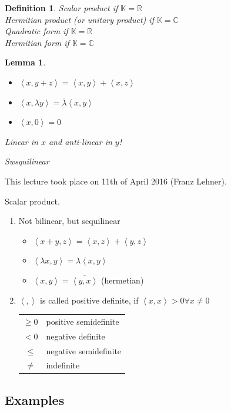 \documentclass[a4paper,landscape,twocolumn]{article}
\newcommand\meta[3]{This #1 took place on #2 (#3).\par}
\newcommand\functional[1]{\left\langle{#1}\right\rangle}
\newtheorem{defi}{Definition}
\newtheorem{lemma}{Lemma}
\begin{document}
\begin{defi}
  Scalar product if $\mathbb K = \mathbb R$ \\
  Hermitian product (or unitary product) if $\mathbb K = \mathbb C$ \\

  Quadratic form if $\mathbb K = \mathbb R$ \\
  Hermitian form if $\mathbb K = \mathbb C$
\end{defi}

\begin{lemma}
  \begin{itemize}
    \item $\functional{x,y+z} = \functional{x,y} + \functional{x,z}$
    \item $\functional{x,\lambda y} = \overline{\lambda} \functional{x,y}$
    \item $\functional{x,0} = 0$
  \end{itemize}
  Linear in $x$ and anti-linear in $y$!

  Swsquilinear
\end{lemma}


\meta{lecture}{11th of April 2016}{Franz Lehner}

Scalar product.
\begin{enumerate}
  \item Not bilinear, but sequilinear
    \begin{itemize}
      \item $\functional{x+y, z} = \functional{x,z} + \functional{y,z}$
      \item $\functional{\lambda x, y} = \lambda \functional{x,y}$
      \item $\functional{x,y} = \overline{\functional{y,x}}$ (hermetian)
    \end{itemize}
  \item $\functional{,}$ is called positive definite, if $\functional{x,x} > 0 \forall x \neq 0$
    \begin{tabular}{cl}
      $\geq 0$ & positive semidefinite \\
      $<0$ & negative definite \\
      $\leq$ & negative semidefinite \\
      $\neq$ & indefinite
    \end{tabular}
\end{enumerate}

\subsection{Examples}
\label{ex-8.15}
\end{document}
